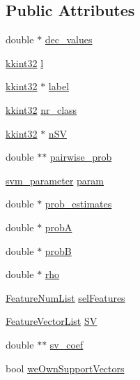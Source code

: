\subsection*{Public Attributes}
\begin{DoxyCompactItemize}
\item 
double $\ast$ \hyperlink{struct_s_v_m289___b_f_s_1_1svm__model_a049da9e71e8581b703d3014a9356facc}{dec\+\_\+values}
\item 
\hyperlink{namespace_k_k_b_a8fa4952cc84fda1de4bec1fbdd8d5b1b}{kkint32} \hyperlink{struct_s_v_m289___b_f_s_1_1svm__model_a2ff6bb0d12016e37a95a5cd6885be92b}{l}
\item 
\hyperlink{namespace_k_k_b_a8fa4952cc84fda1de4bec1fbdd8d5b1b}{kkint32} $\ast$ \hyperlink{struct_s_v_m289___b_f_s_1_1svm__model_a33bf273b5ce4cfff0b4d68210bfa7b2e}{label}
\item 
\hyperlink{namespace_k_k_b_a8fa4952cc84fda1de4bec1fbdd8d5b1b}{kkint32} \hyperlink{struct_s_v_m289___b_f_s_1_1svm__model_af8462268ac97b24a8d96f07874522cfb}{nr\+\_\+class}
\item 
\hyperlink{namespace_k_k_b_a8fa4952cc84fda1de4bec1fbdd8d5b1b}{kkint32} $\ast$ \hyperlink{struct_s_v_m289___b_f_s_1_1svm__model_a4bb18b0f8425add0fd0cede41fac9d00}{n\+SV}
\item 
double $\ast$$\ast$ \hyperlink{struct_s_v_m289___b_f_s_1_1svm__model_ad3030e40fd73b4b3ba65e6af7e0c32c7}{pairwise\+\_\+prob}
\item 
\hyperlink{struct_s_v_m289___b_f_s_1_1svm__parameter}{svm\+\_\+parameter} \hyperlink{struct_s_v_m289___b_f_s_1_1svm__model_a5684e91641a9f3187d45bf5cfa684228}{param}
\item 
double $\ast$ \hyperlink{struct_s_v_m289___b_f_s_1_1svm__model_a8bb5f40004d6d6e4ce39b299111f00cf}{prob\+\_\+estimates}
\item 
double $\ast$ \hyperlink{struct_s_v_m289___b_f_s_1_1svm__model_a5626ef4775f7837e09dec0e2b163085b}{probA}
\item 
double $\ast$ \hyperlink{struct_s_v_m289___b_f_s_1_1svm__model_a0cb0367a81209a239cb14d71505a1c9f}{probB}
\item 
double $\ast$ \hyperlink{struct_s_v_m289___b_f_s_1_1svm__model_a53ee57b614f764a30ef4dc67d2a2167f}{rho}
\item 
\hyperlink{class_k_k_m_l_l_1_1_feature_num_list}{Feature\+Num\+List} \hyperlink{struct_s_v_m289___b_f_s_1_1svm__model_aceafce36596b75a5ca5c085897286c8a}{sel\+Features}
\item 
\hyperlink{class_k_k_m_l_l_1_1_feature_vector_list}{Feature\+Vector\+List} \hyperlink{struct_s_v_m289___b_f_s_1_1svm__model_a0be330087c161794b8127ebaf8efa51b}{SV}
\item 
double $\ast$$\ast$ \hyperlink{struct_s_v_m289___b_f_s_1_1svm__model_aad74e2dda9d5517b2b04d7d82b5e8e5c}{sv\+\_\+coef}
\item 
bool \hyperlink{struct_s_v_m289___b_f_s_1_1svm__model_ab9180dbd9f7c9efcc1e95e543a908afe}{we\+Own\+Support\+Vectors}
\end{DoxyCompactItemize}


